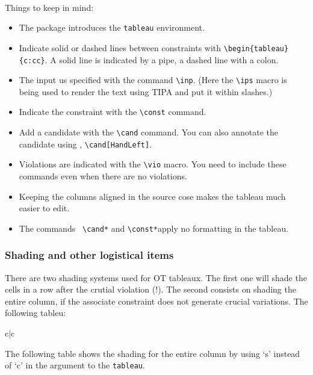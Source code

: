 \documentclass{article}
\begin{document}
\\

Things to keep in mind: 
\begin{itemize}
    \item The package introduces the \texttt{tableau} environment.
    \item Indicate solid or dashed lines between constraints with \verb|\begin{tableau}{c:cc}|. A solid line is indicated by a pipe, a dashed line with a colon.
    \item The input us specified with the command \verb|\inp|. (Here the \verb|\ips| macro is being used to render the text using TIPA and put it within slashes.)
    \item Indicate the constraint with the \verb|\const| command.
    \item Add a candidate with the \verb|\cand| command. You can also annotate the candidate using \HandLeft, \verb|\cand[HandLeft]|.
    \item Violations are indicated with the \verb|\vio| macro. You need to include these commands even when there are no violations. 
    \item Keeping the columns aligned in the source cose makes the tableau much easier to edit.
    \item The commands \verb| \cand*| and \verb|\const*|apply no formatting in the tableau. 
\end{itemize}
\subsubsection{Shading and other logistical items}

There are two shading systems used for OT tableaux. The first one will shade the cells in a row after the crutial violation (!). The second consists on shading the entire column, if the associate constraint does not generate crucial variations. 
The following tableu: \\
\begin{center}
\ShadingOn
\begin{tableau}{c|c}
  
 \vio{*!} \vio{}
 \vio{} \vio{*}
\end{tableau}
\end{center}

The following table shows the shading for the entire column by using `s' instead of `c' in the argument to the \texttt{tableau}. 
\end{document}
